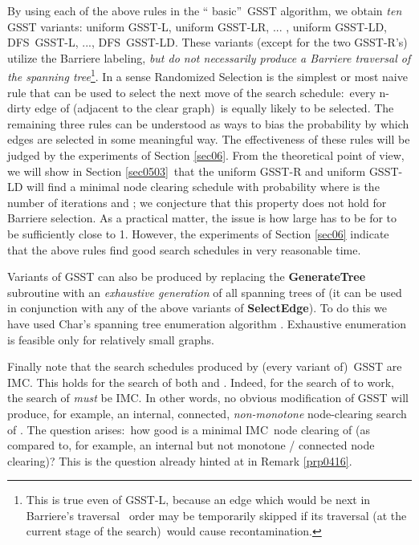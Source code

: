 \documentclass[11pt]{article}\usepackage{amsmath}
\begin{document}
By using each of the above rules in the \textquotedblleft
basic\textquotedblright\ GSST algorithm, we obtain \emph{ten} GSST variants:
uniform GSST-L, uniform GSST-LR, ... , uniform GSST-LD, DFS\ GSST-L, ...,
DFS\ GSST-LD. These variants (except for the two GSST-R's) utilize the
Barriere labeling, \emph{but do not necessarily produce a Barriere traversal
of the spanning tree}\footnote{This is true even of GSST-L, because an edge
which would be next in Barriere's traversal \ order may be temporarily skipped
if its traversal (at the current stage of the search)\ would cause
recontamination.}. In a sense Randomized Selection is the simplest or most
naive rule that can be used to select the next move of the search
schedule:\ every n-dirty edge of  (adjacent to the clear
graph)\ is equally likely to be selected. The remaining three rules can be
understood as ways to bias the probability by which edges are selected in some
meaningful way. The effectiveness of these rules will be judged by the
experiments of Section \ref{sec06}. From the theoretical point of view, we
will show in Section \ref{sec0503}\ that the uniform GSST-R and uniform
GSST-LD will find a minimal node clearing schedule with probability
 where  is the number of iterations and ; we conjecture that this property does not hold for Barriere
selection. As a practical matter, the issue is how large  has to be for
 to be sufficiently close to 1. However, the experiments of
Section \ref{sec06} indicate that the above rules find good search schedules
in very reasonable time.

Variants of GSST can also be produced by replacing the \textbf{GenerateTree}
subroutine with an \emph{exhaustive generation} of all spanning trees of
 (it can be used in conjunction with any of the above variants of
\textbf{SelectEdge}). To do this we have used Char's spanning tree enumeration
algorithm \cite{Jayakumar}. Exhaustive enumeration is feasible only for
relatively small graphs.

Finally note that the search schedules produced by (every variant of)\ GSST
are IMC. This holds for the search of both  and .
Indeed, for the search of  to work, the search of 
\emph{must} be IMC. In other words, no obvious modification of GSST will
produce, for example, an internal, connected, \emph{non-monotone}
node-clearing search of . The question arises:\ how good is a
minimal IMC\ node clearing of  (as compared to, for example, an
internal but not monotone / connected node clearing)? This is the question
already hinted at in Remark \ref{prp0416}.
\end{document}
